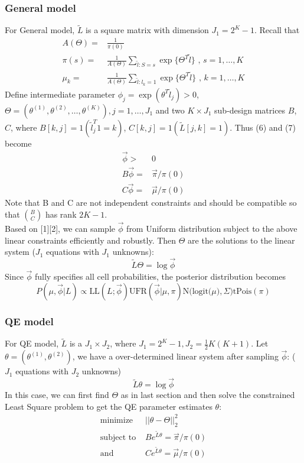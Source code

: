 \documentclass[11 pt, a4paper]{article}  %
\begin{document}
\subsubsection{General model}
For General model, $\tilde{L}$ is a square matrix with dimension $J_1 = 2^K-1$. Recall that 
\begin{align}
A(\Theta) = & \frac{1}{\pi(0)} \nonumber \\
\pi(s) = & \frac{1}{A(\Theta)} \sum_{\tilde{l}:S=s}\exp \{ \Theta^T \tilde{l}\}  \text{ , } s = 1,\ldots, K \\
\mu_k = & \frac{1}{A(\Theta)} \sum_{\tilde{l}:l_k=1}\exp \{ \Theta^T \tilde{l}\}  \text{ , } k = 1, \ldots, K
\end{align}
Define intermediate parameter $\phi_j = \exp(\theta^T\tilde{l}_j) >0$, $\Theta = (\theta^{(1)},\theta^{(2)}, \ldots, \theta^{(K)}), j= 1, \ldots, J_1$ and two $K \times J_1$ sub-design matrices $B$, $C$, where $B[k,j] = 1(\tilde{l}_j^T 1=k)$, $C[k,j] = 1(\tilde{L}[j,k]=1)$. Thus (6) and (7) become
\begin{align*}
\vec{\phi} > & 0\\
B \vec{\phi} = & \vec{\pi}/\pi(0)\\ 
C \vec{\phi} = & \vec{\mu}/\pi(0)
\end{align*}
Note that B and C are not independent constraints and should be compatible so that $\binom{B}{C}$ has rank $2K-1$.\\
Based on [1][2], we can sample $\vec{\phi}$ from Uniform distribution subject to the above linear constraints efficiently and robustly. Then $\Theta$ are the solutions to the linear system ($J_1$ equations with $J_1$ unknowns):
\[\tilde{L}\Theta = \log \vec{\phi}\]
Since $\vec{\phi}$ fully specifies all cell probabilities, the posterior distribution becomes 
\[ P(\mu, \vec{\phi} |L) \propto \text{LL}(L; \vec{\phi}) \text{UFR}(\vec{\phi} |\mu, \pi ) \text{N(logit(}\mu),\Sigma) \text{tPois}(\pi)\]


\subsubsection{QE model}
For QE model, $\tilde{L}$ is a $J_1\times J_2$, where $J_1 = 2^K-1, J_2 = \frac{1}{2}K(K+1)$.  Let $\theta = (\theta^{(1)},\theta^{(2)})$, we have a over-determined linear system after sampling $\vec{\phi}$: ($J_1$ equations with $J_2$ unknowns)
\[\tilde{L}\theta = \log \vec{\phi}\]
In this case, we can first find $\Theta$ as in last section and then solve the constrained Least Square problem to get the QE parameter estimates $\theta$:
\begin{align*}
\text{minimize } & ||\theta - \Theta||^2_2 \\
\text{subject to } & B e^{\tilde{L}\theta} =  \vec{\pi}/\pi(0)\\ 
\text{and } & C e^{\tilde{L}\theta} =  \vec{\mu}/\pi(0)
\end{align*} 
\end{document}
